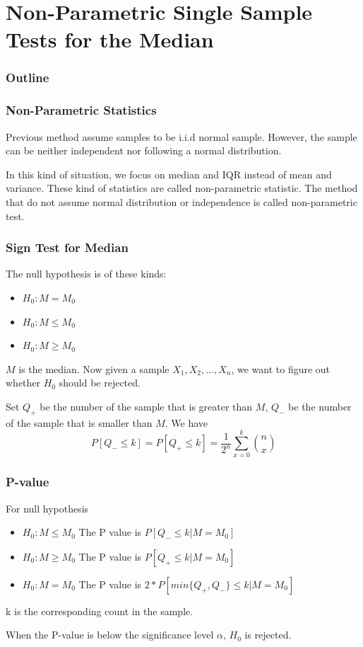 \documentclass{beamer}
\begin{document}
\section{Non-Parametric Single Sample Tests for the Median}

\begin{frame}
    \frametitle{Outline}
    \tableofcontents[currentsection]
\end{frame}

\begin{frame}
    \frametitle{Non-Parametric Statistics}

    Previous method assume samples to be i.i.d normal sample. However, the sample can be neither independent nor following a normal distribution.\par
    In this kind of situation, we focus on median and IQR instead of mean and variance. These kind of statistics are called non-parametric statistic. The method that do not assume normal distribution or independence is called non-parametric test.

\end{frame}

\begin{frame}
    \frametitle{Sign Test for Median}

    The null hypothesis is of these kinds: 
    \begin{itemize}
        \item $H_0: M=M_0$
        \item $H_0: M\leq M_0$
        \item $H_0: M\geq M_0$
    \end{itemize}
    $M$ is the median. Now given a sample $X_1, X_2,\dots , X_n$, we want to figure out whether $H_0$ should be rejected.\par
    Set $Q_{+}$ be the number of the sample that is greater than $M$, $Q_{-}$ be the number of the sample that is smaller than $M$. We have 
    \[P[Q_{-}\leq k]=P[Q_{+}\leq k]=\frac{1}{2^n}\sum\limits_{x=0}^{k} \binom{n}{x}\]

\end{frame}

\begin{frame}
    \frametitle{P-value}

    For null hypothesis
    \begin{itemize}
        \item $H_0: M\leq M_0$ The P value is $P[Q_{-}\leq k|M=M_0]$
        \item $H_0: M\geq M_0$ The P value is $P[Q_{+}\leq k|M=M_0]$
        \item $H_0: M= M_0$ The P value is $2*P[min\{Q_{+},Q_{-}\}\leq k|M=M_0]$
    \end{itemize}
    k is the corresponding count in the sample.\par
    When the P-value is below the significance level $\alpha$, $H_0$ is rejected.

\end{frame}
\end{document}

